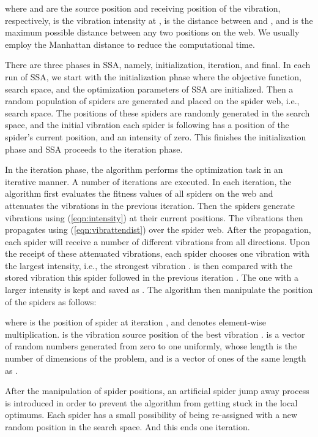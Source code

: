 \documentclass[conference]{IEEEtran}
\begin{document}
where  and  are the source position and receiving position of the vibration, respectively,  is the vibration intensity at ,  is the distance between  and , and  is the maximum possible distance between any two positions on the web. We usually employ the Manhattan distance to reduce the computational time.

There are three phases in SSA, namely, initialization, iteration, and final. In each run of SSA, we start with the initialization phase where the objective function, search space, and the optimization parameters of SSA are initialized. Then a random population of spiders are generated and placed on the spider web, i.e., search space. The positions of these spiders are randomly generated in the search space, and the initial vibration each spider is following has a position of the spider's current position, and an intensity of zero. This finishes the initialization phase and SSA proceeds to the iteration phase.

In the iteration phase, the algorithm performs the optimization task in an iterative manner. A number of iterations are executed. In each iteration, the algorithm first evaluates the fitness values of all spiders on the web and attenuates the vibrations in the previous iteration. Then the spiders generate vibrations using (\ref{eqn:intensity}) at their current positions. The vibrations then propagates using (\ref{eqn:vibrattendist}) over the spider web. After the propagation, each spider will receive a number of different vibrations from all directions. Upon the receipt of these attenuated vibrations, each spider chooses one vibration with the largest intensity, i.e., the strongest vibration .  is then compared with the stored vibration this spider followed in the previous iteration . The one with a larger intensity is kept and saved as . The algorithm then manipulate the position of the spiders as follows:

where  is the position of spider  at iteration , and  denotes element-wise multiplication.  is the vibration source position of the best vibration .  is a vector of random numbers generated from zero to one uniformly, whose length is the number of dimensions of the problem, and  is a vector of ones of the same length as .

After the manipulation of spider positions, an artificial spider jump away process is introduced in order to prevent the algorithm from getting stuck in the local optimums. Each spider has a small possibility of being re-assigned with a new random position in the search space. And this ends one iteration.
\end{document}
